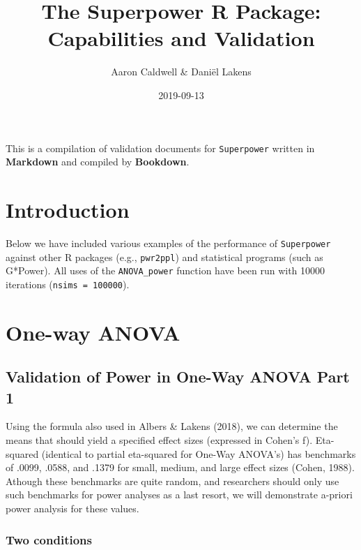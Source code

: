 \documentclass[]{book}
\title{The Superpower R Package: Capabilities and Validation}
\author{Aaron Caldwell \& Daniël Lakens}
\date{2019-09-13}
\begin{document}
\maketitle

{
\setcounter{tocdepth}{1}
\tableofcontents
}
This is a compilation of validation documents for \texttt{Superpower} written in \textbf{Markdown} and compiled by \textbf{Bookdown}.

\hypertarget{introduction}{%
\chapter{Introduction}\label{introduction}}

Below we have included various examples of the performance of \texttt{Superpower} against other R packages (e.g., \texttt{pwr2ppl}) and statistical programs (such as G*Power). All uses of the \texttt{ANOVA\_power} function have been run with 10000 iterations (\texttt{nsims\ =\ 100000}).

\hypertarget{one-way-anova}{%
\chapter{One-way ANOVA}\label{one-way-anova}}

\hypertarget{validation-of-power-in-one-way-anova-part-1}{%
\section{Validation of Power in One-Way ANOVA Part 1}\label{validation-of-power-in-one-way-anova-part-1}}

Using the formula also used in Albers \& Lakens (2018), we can determine the means that should yield a specified effect sizes (expressed in Cohen's f). Eta-squared (identical to partial eta-squared for One-Way ANOVA's) has benchmarks of .0099, .0588, and .1379 for small, medium, and large effect sizes (Cohen, 1988). Athough these benchmarks are quite random, and researchers should only use such benchmarks for power analyses as a last resort, we will demonstrate a-priori power analysis for these values.

\hypertarget{two-conditions}{%
\subsection{Two conditions}\label{two-conditions}}
\end{document}
